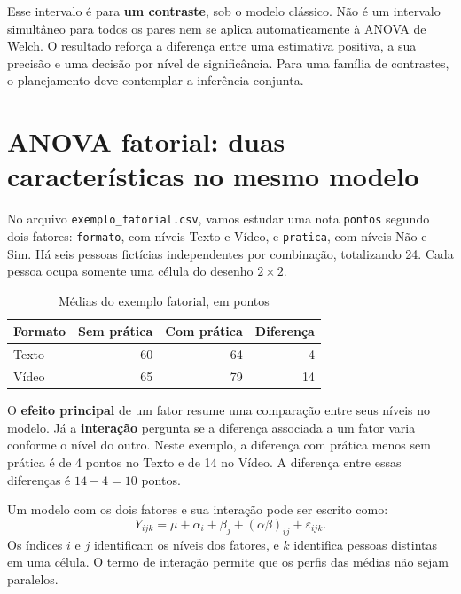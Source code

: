 Esse intervalo é para \textbf{um contraste}, sob o modelo clássico. Não é um intervalo simultâneo para todos os pares nem se aplica automaticamente à ANOVA de Welch. O resultado reforça a diferença entre uma estimativa positiva, a sua precisão e uma decisão por nível de significância. Para uma família de contrastes, o planejamento deve contemplar a inferência conjunta.

\section{ANOVA fatorial: duas características no mesmo modelo}
\label{sec:anova-fatorial}

No arquivo \texttt{exemplo\_fatorial.csv}, vamos estudar uma nota \texttt{pontos} segundo dois fatores: \texttt{formato}, com níveis Texto e Vídeo, e \texttt{pratica}, com níveis Não e Sim. Há seis pessoas fictícias independentes por combinação, totalizando 24. Cada pessoa ocupa somente uma célula do desenho $2\times2$.

\begin{table}[H]
\centering
\caption{Médias do exemplo fatorial, em pontos}
\begin{tabular}{lrrr}
\hline
Formato & Sem prática & Com prática & Diferença \\
\hline
Texto & 60 & 64 & 4 \\
Vídeo & 65 & 79 & 14 \\
\hline
\end{tabular}
\label{tab:medias-fatorial}
\end{table}

O \textbf{efeito principal} de um fator resume uma comparação entre seus níveis no modelo. Já a \textbf{interação} pergunta se a diferença associada a um fator varia conforme o nível do outro. Neste exemplo, a diferença com prática menos sem prática é de 4 pontos no Texto e de 14 no Vídeo. A diferença entre essas diferenças é $14-4=10$ pontos.

Um modelo com os dois fatores e sua interação pode ser escrito como:
\[
Y_{ijk}=\mu+\alpha_i+\beta_j+(\alpha\beta)_{ij}+\varepsilon_{ijk}.
\]
Os índices $i$ e $j$ identificam os níveis dos fatores, e $k$ identifica pessoas distintas em uma célula. O termo de interação permite que os perfis das médias não sejam paralelos.

